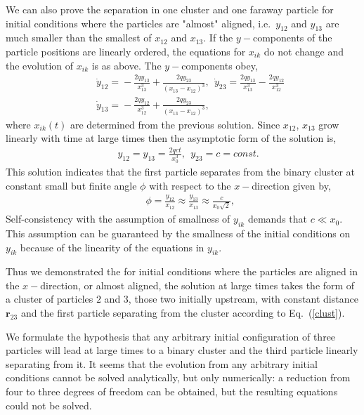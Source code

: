 We can also prove the separation in one cluster and one faraway particle for initial conditions where the particles are "almost" aligned, i.e.\  $y_{12}$ and $y_{13}$ are much smaller than the smallest of $x_{12}$ and $x_{13}$.
%
If the $y-$components of the particle positions are linearly ordered, the equations for $x_{ik}$ do not change and the evolution of $x_{ik}$ is as above. The $y-$components obey,
\begin{eqnarray}&&\!\!\!\!\!\!\!\!\!\!\!
\dot{y}_{12}\!=\!-\frac{2q y_{13}}{x_{13}^3}+\frac{2qy_{23}}{(x_{13}-x_{12})^3},\ \ \dot{y}_{23}=\frac{2q y_{13}}{x_{13}^3}-\frac{2q y_{12}}{x_{12}^3}\nonumber\\&&\!\!\!\!\!\!\!\!\!\!\!
\dot{y}_{13}\!=\!-\frac{2q y_{12}}{x_{12}^3}+\frac{2qy_{23}}{(x_{13}-x_{12})^3},
\end{eqnarray}
where $x_{ik}(t)$ are determined from the previous solution. Since $x_{12}$, $x_{13}$ grow linearly with time at large times then the asymptotic form of the solution is,
\begin{eqnarray}&&\!\!\!\!\!\!\!\!\!\!\!\!\!\!\!\!
y_{12}\!=\!y_{13}\!=\!\frac{2qc t}{x_0^3},\ \ y_{23}=c=const.\ \ \nonumber
\end{eqnarray}
This solution indicates that the first particle separates from the binary cluster at constant small but finite angle $\phi$ with respect to the $x-$direction given by,
\begin{eqnarray}&&\!\!\!\!\!\!\!\!\!\!\!\!\!\!\!\!
\phi=\frac{y_{12}}{x_{12}}\!\approx \frac{y_{13}}{x_{13}}\!\approx \!\frac{c}{x_0\sqrt{2}},
\end{eqnarray}
Self-consistency with the assumption of smallness of $y_{ik}$ demands that $c\ll x_0$. This assumption can be guaranteed by the smallness of the initial conditions on $y_{ik}$ because of the linearity of the equations in $y_{ik}$.

Thus we demonstrated the for initial conditions where the particles are aligned in the $x-$direction, or almost aligned, the solution at large times takes the form of a cluster of particles $2$ and $3$, those two initially upstream, with constant distance $\bm r_{23}$ and the first particle separating from the cluster according to Eq.~(\ref{clust}).

We formulate the hypothesis that any arbitrary initial configuration of three particles will lead at large times to a binary cluster and the third particle linearly separating from it. It seems that the evolution from any arbitrary initial conditions cannot be solved analytically, but only numerically: %
a reduction from four to three degrees of freedom can be obtained, but the resulting equations could not be solved.



